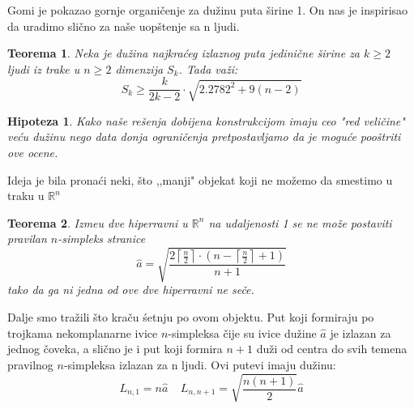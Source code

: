 \documentclass[b1paper,portrait]{template/baposter}
\newtheorem{theorem}{Teorema}
\newtheorem*{hipoteza}{Hipoteza}
\begin{document}
\begin{poster}
{
	Gomi je pokazao gornje organi\v cenje za du\v zinu puta \v sirine 1.
	On nas je inspirisao da uradimo sli\v cno za na\v se uop\v stenje sa n ljudi.
	\begin{theorem}
		Neka je du\v zina najkra\' ceg izlaznog puta jedini\v cne \v sirine za $k\geqslant 2$ ljudi iz trake u $n\geqslant 2$ dimenzija $S_k$. Tada va\v zi:
		$$S_k\geqslant\frac{k}{2k-2}\cdot \sqrt{2.2782^2+9(n-2)}$$
	\end{theorem}
	\begin{hipoteza}
		Kako na\v se re\v senja dobijena konstrukcijom imaju ceo "red veli\v cine" ve\' cu du\v zinu nego 
		data donja ograni\v cenja pretpostavljamo da je mogu\' ce poo\v striti ove ocene. 
	\end{hipoteza}
	\vspace{0.15cm}
}



{
 	Ideja je bila  prona\' ci neki, \v sto ,,manji" objekat koji ne mo\v zemo da smestimo u traku u $\mathbb{R}^n$
 	\begin{theorem}
 		Izme\dj u dve hiperravni u $\mathbb{R}^n$ na udaljenosti 1 se ne mo\v ze postaviti pravilan $n$-simpleks stranice
 		$$\hat{a} = \sqrt{\frac{2\left\lceil \frac{n}{2}\right\rceil\cdot \left( n-\left\lceil\frac{n}{2}\right\rceil+1\right)}{n+1}}$$
 		tako da ga ni jedna od ove dve hiperravni ne se\v ce. 
 	\end{theorem}
 	Dalje smo tra\v zili \v sto kra\v cu \' setnju po ovom objektu.
 	Put koji formiraju po trojkama nekomplanarne ivice $n$-simpleksa \v cije su ivice du\v zine $\hat{a}$
 	je izlazan za jednog \v coveka, a sli\v cno je i put koji formira $n+1$ du\v zi 
 	od centra do svih temena pravilnog $n$-simpleksa  izlazan za n ljudi. Ovi putevi imaju du\v zinu:
	$$L_{n,1}=n\hat{a} \ \ \ \ \  L_{n, n+1}=\sqrt{\frac{n(n+1)}{2}}\hat{a}$$
 	\begin{center}
 		

\end{center}}
\end{poster}
\end{document}
